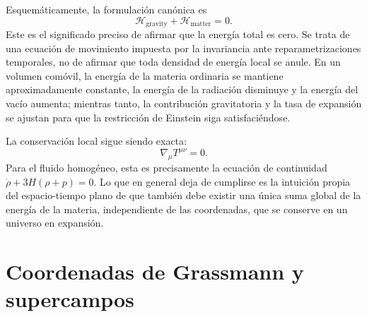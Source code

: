 Esquemáticamente, la formulación canónica es
\begin{equation}
\mathcal H_{\mathrm{gravity}}
+\mathcal H_{\mathrm{matter}}
=0.
\end{equation}
Este es el significado preciso de afirmar que la energía total es cero. Se trata de una ecuación de movimiento impuesta por la invariancia ante reparametrizaciones temporales, no de afirmar que toda densidad de energía local se anule. En un volumen comóvil, la energía de la materia ordinaria se mantiene aproximadamente constante, la energía de la radiación disminuye y la energía del vacío aumenta; mientras tanto, la contribución gravitatoria y la tasa de expansión se ajustan para que la restricción de Einstein siga satisfaciéndose.

La conservación local sigue siendo exacta:
\begin{equation}
\nabla_\mu T^{\mu\nu}=0.
\end{equation}
Para el fluido homogéneo, esta es precisamente la ecuación de continuidad
\(\dot\rho+3H(\rho+p)=0\). Lo que en general deja de cumplirse es la intuición propia del espacio-tiempo plano de que también debe existir una única suma global de la energía de la materia, independiente de las coordenadas, que se conserve en un universo en expansión.

\begin{classroomqa}
\end{classroomqa}

\section{Coordenadas de Grassmann y supercampos}

\begin{classroomqa}
\end{classroomqa}

